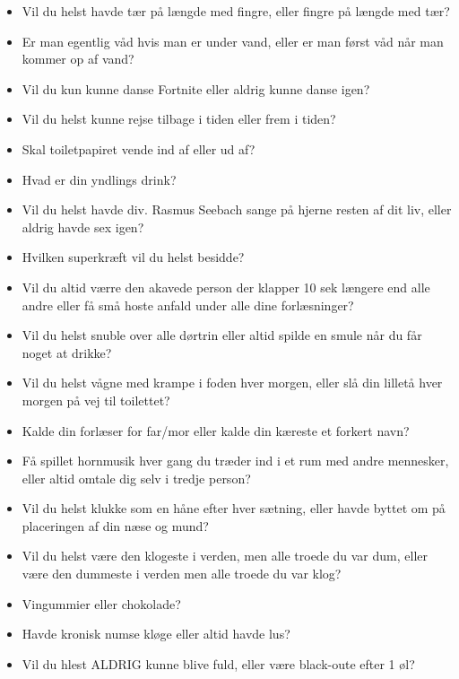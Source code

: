 \documentclass[../../../main.tex]{subfiles}
\begin{document}
\begin{itemize}
    \item Vil du helst havde tær på længde med fingre, eller fingre på længde med tær?
    \item Er man egentlig våd hvis man er under vand, eller er man først våd når man kommer op af vand?
    \item Vil du kun kunne danse Fortnite eller aldrig kunne danse igen?
    \item Vil du helst kunne rejse tilbage i tiden eller frem i tiden?
    \item Skal toiletpapiret vende ind af eller ud af?
    \item Hvad er din yndlings drink?
    \item Vil du helst havde div. Rasmus Seebach sange på hjerne resten af dit liv, eller aldrig havde sex igen?
    \item Hvilken superkræft vil du helst besidde?
    \item Vil du altid værre den akavede person der klapper 10 sek længere end alle andre eller få små hoste anfald under alle dine forlæsninger?
    \item Vil du helst snuble over alle dørtrin eller altid spilde en smule når du får noget at drikke?
    \item Vil du helst vågne med krampe i foden hver morgen, eller slå din lilletå hver morgen på vej til toilettet?
    \item Kalde din forlæser for far/mor eller kalde din kæreste et forkert navn?
    \item Få spillet hornmusik hver gang du træder ind i et rum med andre mennesker, eller altid omtale dig selv i tredje person?
    \item Vil du helst klukke som en håne efter hver sætning, eller havde byttet om på placeringen af din næse og mund?
    \item Vil du helst være den klogeste i verden, men alle troede du var dum, eller være den dummeste i verden men alle troede du var klog?
    \item Vingummier eller chokolade?
    \item Havde kronisk numse kløge eller altid havde lus?
    \item Vil du hlest ALDRIG kunne blive fuld, eller være black-oute efter 1 øl?
    
\end{itemize}
\end{document}
